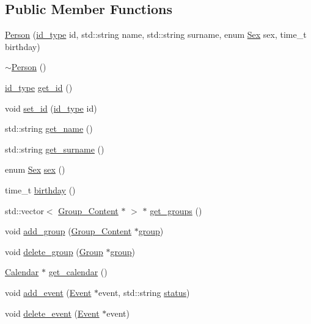 \subsection*{Public Member Functions}
\begin{DoxyCompactItemize}
\item 
\hyperlink{classPerson_a3f28ee718c6ed2692ecf767ed1b2a86f}{Person} (\hyperlink{types_8h_a0b60c08a3ab1435cccc5643d32d8ccee}{id\_\-type} id, std::string name, std::string surname, enum \hyperlink{classPerson_a328ea8d2e8c2674688c7f944fab70b6b}{Sex} sex, time\_\-t birthday)
\item 
\hyperlink{classPerson_a700ffd693321c5fe6880262acf43d4da}{$\sim$Person} ()
\item 
\hyperlink{types_8h_a0b60c08a3ab1435cccc5643d32d8ccee}{id\_\-type} \hyperlink{classPerson_addbe4758044124636fb0f9d3094c6fcb}{get\_\-id} ()
\item 
void \hyperlink{classPerson_ab71f6c7ca2abd23309282a7a93b4d639}{set\_\-id} (\hyperlink{types_8h_a0b60c08a3ab1435cccc5643d32d8ccee}{id\_\-type} id)
\item 
std::string \hyperlink{classPerson_a1837ca2f4ba804aeee2a70c1a1fdd468}{get\_\-name} ()
\item 
std::string \hyperlink{classPerson_aad33f79ec5c96aa3ab30c9c4c989fb4b}{get\_\-surname} ()
\item 
enum \hyperlink{classPerson_a328ea8d2e8c2674688c7f944fab70b6b}{Sex} \hyperlink{classPerson_ae73331abe20c0f03fcb04de8a6adde46}{sex} ()
\item 
time\_\-t \hyperlink{classPerson_aec14dd73ca58227cc70c4ba3a5065d02}{birthday} ()
\item 
std::vector$<$ \hyperlink{structGroup__Content}{Group\_\-Content} $\ast$ $>$ $\ast$ \hyperlink{classPerson_a24cd3ad56c42c1cd34505b1094e6e7d5}{get\_\-groups} ()
\item 
void \hyperlink{classPerson_aa17159e6bb16f2a42a1c4bcae08ae903}{add\_\-group} (\hyperlink{structGroup__Content}{Group\_\-Content} $\ast$\hyperlink{group__content_8h_a27517aa1480ab2d9bfe5d62e693b33eb}{group})
\item 
void \hyperlink{classPerson_a93dfe7e17e0316b1f7dddebf5fd3f7ce}{delete\_\-group} (\hyperlink{classGroup}{Group} $\ast$\hyperlink{group__content_8h_a27517aa1480ab2d9bfe5d62e693b33eb}{group})
\item 
\hyperlink{classCalendar}{Calendar} $\ast$ \hyperlink{classPerson_abaaac95db5394d3ad78ad08221b1d231}{get\_\-calendar} ()
\item 
void \hyperlink{classPerson_a57689e959d613756a806e5d32654d3e8}{add\_\-event} (\hyperlink{classEvent}{Event} $\ast$event, std::string \hyperlink{group__content_8h_ab4d38e7365d935f2a5f1403eec29127e}{status})
\item 
void \hyperlink{classPerson_ab788997b3b66a72e51f924d416029ff5}{delete\_\-event} (\hyperlink{classEvent}{Event} $\ast$event)
\end{DoxyCompactItemize}


